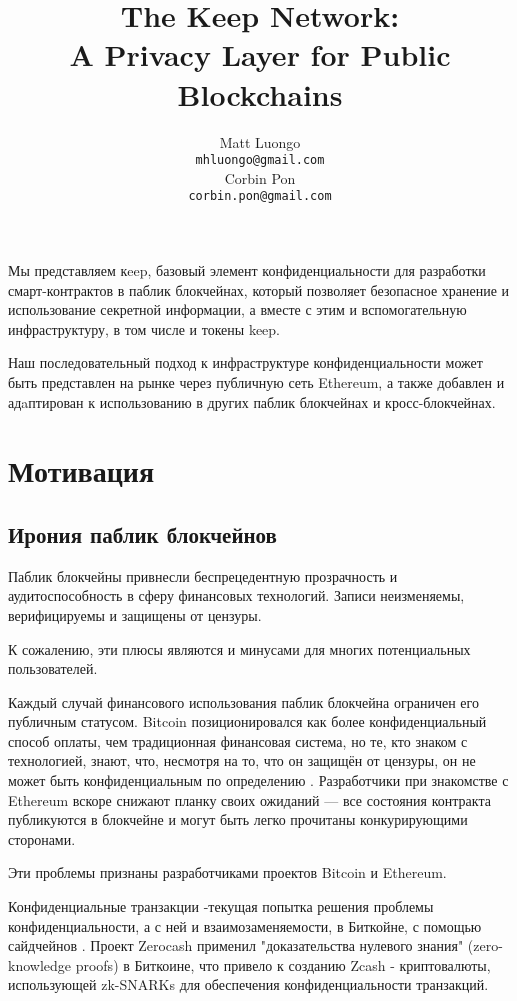 \documentclass[russian,english,11pt]{article}
\title{The Keep Network:\protect\\A Privacy Layer for Public Blockchains}
\author{Matt Luongo \\
  {\tt mhluongo@gmail.com} \\\And
  Corbin Pon \\
  {\tt corbin.pon@gmail.com} \\}
\date{}
\begin{document}
\thispagestyle{fancy}

\maketitle

\begin{Резюме}

  Мы представляем кeep, базовый элемент конфиденциальности 
  для разработки смарт-контрактов в паблик блокчейнах, который 
  позволяет безопасное хранение и использование секретной 
  информации, а вместе с этим и вспомогательную  инфраструктуру, 
  в том числе и токены keep.

  Наш последовательный подход к инфраструктуре конфиденциальности 
  может быть представлен на рынке через публичную сеть Ethereum, 
  а также добавлен и адaптирован к использованию в других 
  паблик блокчейнах и кросс-блокчейнах.

\end{Резюме}

\section{Мотивация}

\subsection{Ирония паблик блокчейнов}

Паблик блокчейны привнесли беспрецедентную прозрачность и 
аудитоспособность в сферу финансовых технологий. 
Записи неизменяемы, верифицируемы и защищены от цензуры.

К сожалению, эти плюсы являются и минусами для многих потенциальных 
пользователей. 

Каждый  случай финансового использования паблик блокчейна ограничен 
его публичным статусом. Bitcoin позиционировался как более 
конфиденциальный способ оплаты, чем традиционная финансовая система, 
но те, кто знаком с технологией, знают, что, несмотря на то, что 
он защищён от цензуры, он не может быть конфиденциальным по 
определению \cite{bitcoinPrivacy}. Разработчики при знакомстве с 
Ethereum вскоре снижают планку своих ожиданий \cite{ethereumStackexchange}— 
все состояния контракта публикуются в блокчейне и могут быть легко 
прочитаны конкурирующими сторонами.

Эти проблемы признаны разработчиками проектов Bitcoin и Ethereum.

Конфиденциальные транзакции \cite{confidentialTransactions}-текущая 
попытка решения проблемы конфиденциальности, а с ней и 
взаимозаменяемости, в Биткойне, с помощью сайдчейнов \cite{confidentialTransactionsElements}. 
Проект Zerocash \cite{zerocash} применил "доказательства нулевого 
знания" (zero-knowledge proofs) в Биткоине, что привело к созданию 
Zcash \cite{zcash}- криптовалюты, использующей zk-SNARKs для 
обеспечения конфиденциальности транзакций.
\end{document}
